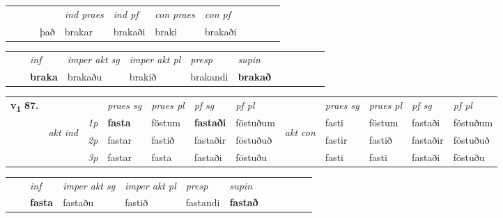 \begin{tabular}{llllllllllll}
 & &  & &  \textit{ind praes} & \textit{ind pf} & \textit{con praes} & \textit{con pf} \\*
&  & & það & brakar & brakaði & braki & brakaði \\*
\cmidrule{5-9}
\end{tabular}


\begin{tabular}{llllllllllll}
 & & \textit{inf} & \textit{imper akt sg} & \textit{imper akt pl}   & \textit{presp} & \textit{supin}       \\*
  & & \textbf{braka} & brakaðu  & brakið   & brakandi &  \textbf{brakað}   \\*
\cmidrule{1-12}
\end{tabular}



\begin{tabular}{llllllllllll} \toprule
\multirow{4}{*}{{{\textbf{v{\textsubscript{1}}} \Large{\textbf{87.}}}}}  & &   &  \textit{praes sg}  & \textit{praes pl}  &\textit{ pf sg} & \textit{pf pl} &  &  \textit{praes sg}  & \textit{praes pl}  & \textit{pf sg} & \textit{pf pl } \\*
	\cmidrule{4-7} \cmidrule{9-12}
 & \multirow{3}{*}{\begin{turn}{90}\textit{akt ind}\end{turn}} & {\textit{1p}} & \textbf{fasta} & föstum    & \textbf{fastaði} & föstuðum & \multirow{3}{*}{\begin{turn}{90}\textit{akt con}\end{turn}} &fasti & föstum & fastaði & föstuðum\\*
& &  {\textit{2p}} &  fastar  & fastið   & fastaðir & föstuðuð & & fastir & fastið & fastaðir & föstuðuð \\*
& &  {\textit{3p}} & fastar & fasta   & fastaði & föstuðu & & fasti & fasti& fastaði & föstuðu  \\*
\cmidrule{4-7} \cmidrule{9-12}
\end{tabular}


\begin{tabular}{llllllllllll}
 & & \textit{inf} & \textit{imper akt sg} & \textit{imper akt pl}   & \textit{presp} & \textit{supin}       \\*
  & & \textbf{fasta} & fastaðu  & fastið   & fastandi &  \textbf{fastað}   \\*
\cmidrule{1-12}
\end{tabular}



